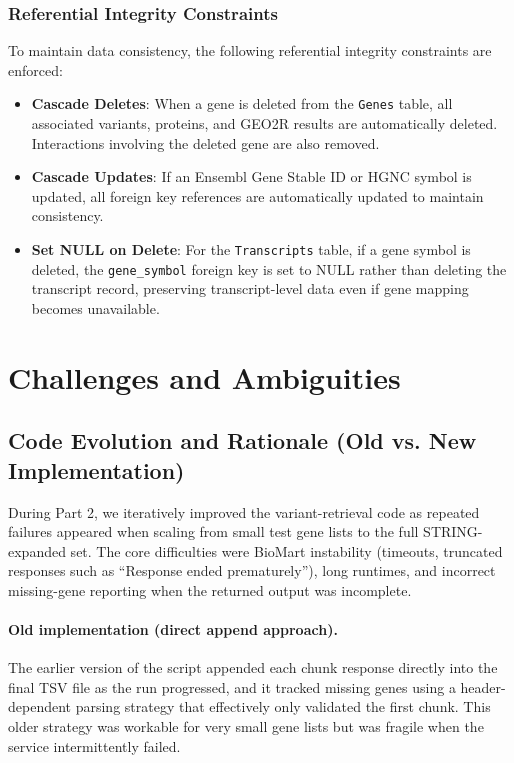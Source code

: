 \documentclass[11pt]{article}
\begin{document}
\subsubsection{Referential Integrity Constraints}

To maintain data consistency, the following referential integrity constraints are enforced:

\begin{itemize}
	\item \textbf{Cascade Deletes}: When a gene is deleted from the \texttt{Genes} table, all associated variants, proteins, and GEO2R results are automatically deleted. Interactions involving the deleted gene are also removed.
	
	\item \textbf{Cascade Updates}: If an Ensembl Gene Stable ID or HGNC symbol is updated, all foreign key references are automatically updated to maintain consistency.
	
	\item \textbf{Set NULL on Delete}: For the \texttt{Transcripts} table, if a gene symbol is deleted, the \texttt{gene\_symbol} foreign key is set to NULL rather than deleting the transcript record, preserving transcript-level data even if gene mapping becomes unavailable.
\end{itemize}
	\section{Challenges and Ambiguities}\label{sec:challenges}
		
	\subsection{Code Evolution and Rationale (Old vs. New Implementation)}
	\label{subsec:code_evolution}
	
	During Part 2, we iteratively improved the variant-retrieval code as repeated failures appeared when scaling from small test gene lists to the full STRING-expanded set. The core difficulties were BioMart instability (timeouts, truncated responses such as ``Response ended prematurely''), long runtimes, and incorrect missing-gene reporting when the returned output was incomplete.
	
	\paragraph{Old implementation (direct append approach).}
	The earlier version of the script appended each chunk response directly into the final TSV file as the run progressed, and it tracked missing genes using a header-dependent parsing strategy that effectively only validated the first chunk. This older strategy was workable for very small gene lists but was fragile when the service intermittently failed.
	
\end{document}
